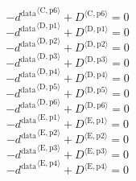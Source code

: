 \begin{equation}
-{d^{\mathrm{data}}}^{\langle \mathrm{\mathrm{C}},\mathrm{\mathrm{p6}}\rangle} + {D}^{\langle \mathrm{C},\mathrm{p6}\rangle} = 0
\end{equation}
\begin{equation}
-{d^{\mathrm{data}}}^{\langle \mathrm{\mathrm{D}},\mathrm{\mathrm{p1}}\rangle} + {D}^{\langle \mathrm{D},\mathrm{p1}\rangle} = 0
\end{equation}
\begin{equation}
-{d^{\mathrm{data}}}^{\langle \mathrm{\mathrm{D}},\mathrm{\mathrm{p2}}\rangle} + {D}^{\langle \mathrm{D},\mathrm{p2}\rangle} = 0
\end{equation}
\begin{equation}
-{d^{\mathrm{data}}}^{\langle \mathrm{\mathrm{D}},\mathrm{\mathrm{p3}}\rangle} + {D}^{\langle \mathrm{D},\mathrm{p3}\rangle} = 0
\end{equation}
\begin{equation}
-{d^{\mathrm{data}}}^{\langle \mathrm{\mathrm{D}},\mathrm{\mathrm{p4}}\rangle} + {D}^{\langle \mathrm{D},\mathrm{p4}\rangle} = 0
\end{equation}
\begin{equation}
-{d^{\mathrm{data}}}^{\langle \mathrm{\mathrm{D}},\mathrm{\mathrm{p5}}\rangle} + {D}^{\langle \mathrm{D},\mathrm{p5}\rangle} = 0
\end{equation}
\begin{equation}
-{d^{\mathrm{data}}}^{\langle \mathrm{\mathrm{D}},\mathrm{\mathrm{p6}}\rangle} + {D}^{\langle \mathrm{D},\mathrm{p6}\rangle} = 0
\end{equation}
\begin{equation}
-{d^{\mathrm{data}}}^{\langle \mathrm{\mathrm{E}},\mathrm{\mathrm{p1}}\rangle} + {D}^{\langle \mathrm{E},\mathrm{p1}\rangle} = 0
\end{equation}
\begin{equation}
-{d^{\mathrm{data}}}^{\langle \mathrm{\mathrm{E}},\mathrm{\mathrm{p2}}\rangle} + {D}^{\langle \mathrm{E},\mathrm{p2}\rangle} = 0
\end{equation}
\begin{equation}
-{d^{\mathrm{data}}}^{\langle \mathrm{\mathrm{E}},\mathrm{\mathrm{p3}}\rangle} + {D}^{\langle \mathrm{E},\mathrm{p3}\rangle} = 0
\end{equation}
\begin{equation}
-{d^{\mathrm{data}}}^{\langle \mathrm{\mathrm{E}},\mathrm{\mathrm{p4}}\rangle} + {D}^{\langle \mathrm{E},\mathrm{p4}\rangle} = 0
\end{equation}
